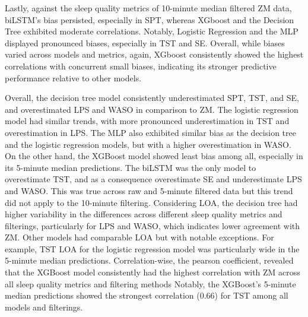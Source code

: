 \documentclass[
  10pt,
]{scrbook}
\begin{document}
Lastly, against the sleep quality metrics of 10-minute median filtered
ZM data, biLSTM's bias persisted, especially in SPT, whereas XGboost and
the Decision Tree exhibited moderate correlations. Notably, Logistic
Regression and the MLP displayed pronounced biases, especially in TST
and SE. Overall, while biases varied across models and metrics, again,
XGboost consistently showed the highest correlations with concurrent
small biases, indicating its stronger predictive performance relative to
other models.

Overall, the decision tree model consistently underestimated SPT, TST,
and SE, and overestimated LPS and WASO in comparison to ZM. The logistic
regression model had similar trends, with more pronounced
underestimation in TST and overestimation in LPS. The MLP also exhibited
similar bias as the decision tree and the logistic regression models,
but with a higher overestimation in WASO. On the other hand, the XGBoost
model showed least bias among all, especially in its 5-minute median
predictions. The biLSTM was the only model to overestimate TST, and as a
consequence overestimate SE and underestimate LPS and WASO. This was
true across raw and 5-minute filtered data but this trend did not apply
to the 10-minute filtering. Considering LOA, the decision tree had
higher variability in the differences across different sleep quality
metrics and filterings, particularly for LPS and WASO, which indicates
lower agreement with ZM. Other models had comparable LOA but with
notable exceptions. For example, TST LOA for the logistic regression
model was particularly wide in the 5-minute median predictions.
Correlation-wise, the pearson coefficient, revealed that the XGBoost
model consistently had the highest correlation with ZM across all sleep
quality metrics and filtering methods Notably, the XGBoost's 5-minute
median predictions showed the strongest correlation (0.66) for TST among
all models and filterings.

\begingroup

\scriptsize
\end{document}
